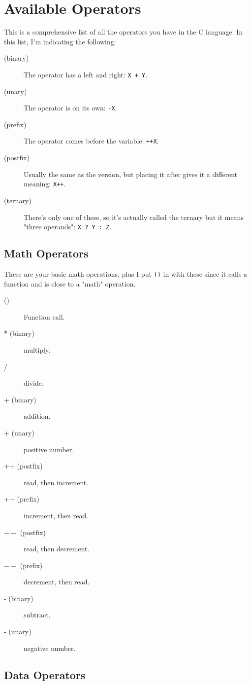 \section{Available Operators}

This is a comprehensive list of all the operators you have in the C language.
In this list, I'm indicating the following:

\begin{description}
\item[(binary)] The operator has a left and right: \verb|X + Y|.
\item[(unary)] The operator is on its own: \verb|-X|.
\item[(prefix)] The operator comes before the variable: \verb|++X|.
\item[(postfix)] Usually the same as the  version, but placing it
    after gives it a different meaning: \verb|X++|.
\item[(ternary)] There's only one of these, so it's actually called the
    ternary but it means "three operands": \verb|X ? Y : Z|.
\end{description}


\subsection{Math Operators}

These are your basic math operations, plus I put \verb|()| in
with these since it calls a function and is close to a "math"
operation.

\begin{description}
\item[()] Function call.
\item[* (binary)] multiply.
\item[/] divide.
\item[+ (binary)] addition.
\item[+ (unary)] positive number.
\item[++ (postfix)] read, then increment.
\item[++ (prefix)] increment, then read.
\item[$--$ (postfix)] read, then decrement.
\item[$--$ (prefix)] decrement, then read.
\item[- (binary)] subtract.
\item[- (unary)] negative number.
\end{description}

\subsection{Data Operators}

